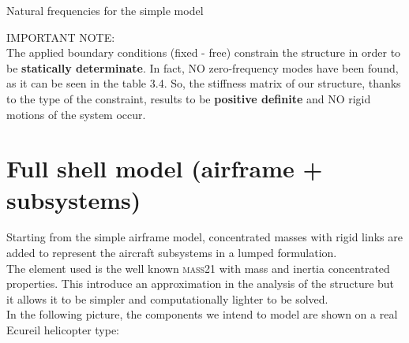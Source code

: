 \begin{table}[h!]
	\centering
	\caption{Natural frequencies for the simple model}
	\label{tab:ModalFreq-Shellmodel}
\end{table}


\bigskip
\noindent
IMPORTANT NOTE: \\
The applied boundary conditions (fixed - free) constrain the structure in order to be \textbf{statically determinate}. In fact, NO zero-frequency modes have been found, as it can be seen in the table 3.4.
So, the stiffness matrix of our structure, thanks to the type of the constraint, results to be \textbf{positive definite} and NO rigid motions of the system occur. \\




\clearpage
\section{Full shell model (airframe + subsystems)}

\noindent
Starting from the simple airframe model, concentrated masses with rigid links are added to represent the aircraft subsystems in a lumped formulation. \\ The element used is the well known \textsc{mass21} with mass and inertia concentrated properties. This introduce an approximation in the analysis of the structure but it allows it to be simpler and computationally lighter to be solved. \\
In the following picture, the components we intend to model are shown on a real Ecureil helicopter type: \\ 


